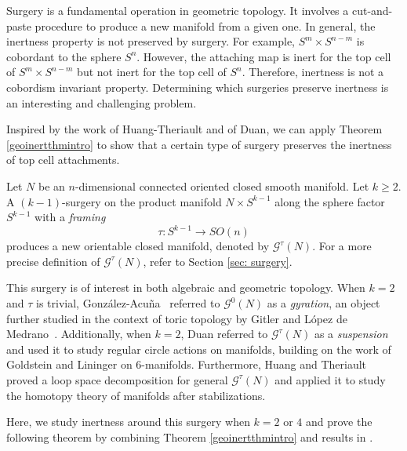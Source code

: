 \documentclass[a4]{amsart}
\theoremstyle{definition}
\begin{document}
\begin{sloppypar}
Surgery is a fundamental operation in geometric topology. It involves a cut-and-paste procedure to produce a new manifold from a given one. In general, the inertness property is not preserved by surgery. For example, $S^m\times S^{n-m}$ is cobordant to the sphere $S^{n}$. However, the attaching map is inert for the top cell of $S^m\times S^{n-m}$ but not inert for the top cell of $S^n$. Therefore, inertness is not a cobordism invariant property. Determining which surgeries preserve inertness is an interesting and challenging problem. 

Inspired by the work \cite{HT23} of Huang-Theriault and \cite{Dua22} of Duan, we can apply Theorem \ref{geoinertthmintro} to show that a certain type of surgery preserves the inertness of top cell attachments. 

Let $N$ be an $n$-dimensional connected oriented closed smooth manifold. Let $k\geq 2$. A $(k-1)$-surgery on the product manifold $N\times S^{k-1}$ along the sphere factor $S^{k-1}$ with a {\it framing} 
\[
\tau: S^{k-1}\stackrel{}{\longrightarrow} SO(n)
\]
produces a new orientable closed manifold, denoted by $\mathcal{G}^{\tau}(N)$. For a more precise definition of $\mathcal{G}^{\tau}(N)$, refer to Section \ref{sec: surgery}. 

This surgery is of interest in both algebraic and geometric topology. When $k=2$ and $\tau$ is trivial, Gonz\'{a}lez-Acu\~{n}a~\cite{GA75} referred  to $\mathcal{G}^{0}(N)$ as a \emph{gyration}, an object further studied in the context of toric topology by Gitler and L\'{o}pez de Medrano~\cite{GLdM13}. Additionally, when $k=2$, Duan \cite{Dua22} referred to $\mathcal{G}^{\tau}(N)$ as a \emph{suspension} and used it to study regular circle actions on manifolds, building on the work of Goldstein and Lininger \cite{GL71} on $6$-manifolds. Furthermore, Huang and Theriault \cite{HT23} proved a loop space decomposition for general $\mathcal{G}^{\tau}(N)$ and applied it to study the homotopy theory of manifolds after stabilizations.

Here, we study inertness around this surgery when $k=2$ or $4$ and prove the following theorem by combining Theorem \ref{geoinertthmintro} and results in \cite{HT23}.


\end{sloppypar}
\end{document}
